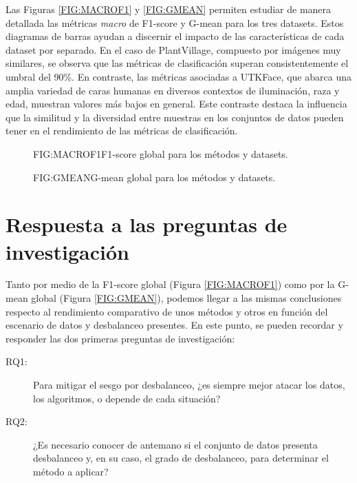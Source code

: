 Las Figuras \ref{FIG:MACROF1} y \ref{FIG:GMEAN} permiten estudiar de manera detallada las métricas \textit{macro} de F1-score y G-mean para los tres datasets. Estos diagramas de barras ayudan a discernir el impacto de las características de cada dataset por separado. En el caso de PlantVillage, compuesto por imágenes muy similares, se observa que las métricas de clasificación superan consistentemente el umbral del 90\%. En contraste, las métricas asociadas a UTKFace, que abarca una amplia variedad de caras humanas en diversos contextos de iluminación, raza y edad, muestran valores más bajos en general. Este contraste destaca la influencia que la similitud y la diversidad entre muestras en los conjuntos de datos pueden tener en el rendimiento de las métricas de clasificación.

\begin{figure}[Macro F1-score]{FIG:MACROF1}{F1-score global para los métodos y datasets.}
\end{figure}

\begin{figure}[Macro G-mean]{FIG:GMEAN}{G-mean global para los métodos y datasets.}
\end{figure}

\section{Respuesta a las preguntas de investigación\label{SEC:RESPUESTA_RQS}}

Tanto por medio de la F1-score global (Figura \ref{FIG:MACROF1}) como por la G-mean global (Figura \ref{FIG:GMEAN}), podemos llegar a las mismas conclusiones respecto al rendimiento comparativo de unos métodos y otros en función del escenario de datos y desbalanceo presentes. En este punto, se pueden recordar y responder las dos primeras preguntas de investigación:

\begin{description}
    \item[RQ1:] Para mitigar el sesgo por desbalanceo, ¿es siempre mejor atacar los datos, los algoritmos, o depende de cada situación?
    \item[RQ2:] ¿Es necesario conocer de antemano si el conjunto de datos presenta desbalanceo y, en su caso, el grado de desbalanceo, para determinar el método a aplicar?
\end{description}

